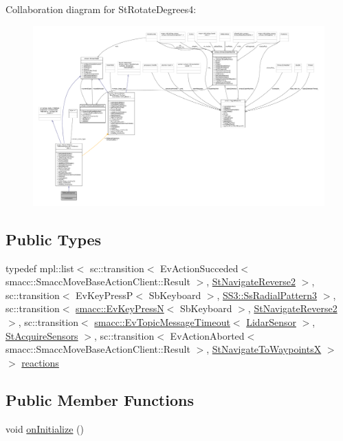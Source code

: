 Collaboration diagram for St\+Rotate\+Degrees4\+:
\nopagebreak
\begin{figure}[H]
\begin{center}
\leavevmode
\includegraphics[width=350pt]{structStRotateDegrees4__coll__graph}
\end{center}
\end{figure}
\subsection*{Public Types}
\begin{DoxyCompactItemize}
\item 
typedef mpl\+::list$<$ sc\+::transition$<$ Ev\+Action\+Succeded$<$ smacc\+::\+Smacc\+Move\+Base\+Action\+Client\+::\+Result $>$, \hyperlink{structStNavigateReverse2}{St\+Navigate\+Reverse2} $>$, sc\+::transition$<$ Ev\+Key\+PressP$<$ Sb\+Keyboard $>$, \hyperlink{structSS3_1_1SsRadialPattern3}{S\+S3\+::\+Ss\+Radial\+Pattern3} $>$, sc\+::transition$<$ \hyperlink{structsmacc_1_1EvKeyPressN}{smacc\+::\+Ev\+Key\+PressN}$<$ Sb\+Keyboard $>$, \hyperlink{structStNavigateReverse2}{St\+Navigate\+Reverse2} $>$, sc\+::transition$<$ \hyperlink{structsmacc_1_1EvTopicMessageTimeout}{smacc\+::\+Ev\+Topic\+Message\+Timeout}$<$ \hyperlink{sensor__state_8h_a9db9e1944f88de79507758d08e4a2ee3}{Lidar\+Sensor} $>$, \hyperlink{structStAcquireSensors}{St\+Acquire\+Sensors} $>$, sc\+::transition$<$ Ev\+Action\+Aborted$<$ smacc\+::\+Smacc\+Move\+Base\+Action\+Client\+::\+Result $>$, \hyperlink{structStNavigateToWaypointsX}{St\+Navigate\+To\+WaypointsX} $>$ $>$ \hyperlink{structStRotateDegrees4_a506bf7076b8efde58968fbe6782d259c}{reactions}
\end{DoxyCompactItemize}
\subsection*{Public Member Functions}
\begin{DoxyCompactItemize}
\item 
void \hyperlink{structStRotateDegrees4_a25d516dde465ddfedc3a875fd93b9f47}{on\+Initialize} ()
\end{DoxyCompactItemize}
